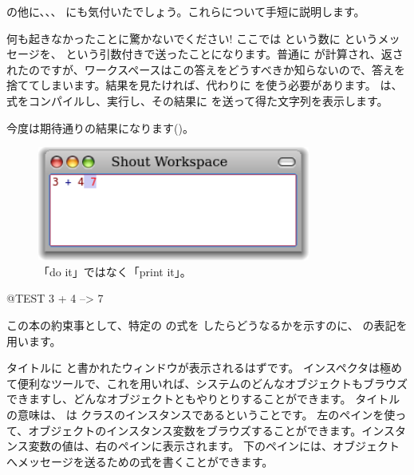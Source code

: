 \documentclass[a4paper,10pt,twoside]{book}
\begin{document}
 の他に、、、 にも気付いたでしょう。これらについて手短に説明します。


何も起きなかったことに驚かないでください! ここでは  という数に \ct{+} というメッセージを、 という引数付きで送ったことになります。普通に  が計算され、返されたのですが、ワークスペースはこの答えをどうすべきか知らないので、答えを捨ててしまいます。結果を見たければ、代わりに  を使う必要があります。 は、式をコンパイルし、実行し、その結果に  を送って得た文字列を表示します。

今度は期待通りの結果になります()。

\begin{figure}[htb]
\centerline {\includegraphics[width=0.8\textwidth]{PrintIt}}
\caption{「do it」ではなく「print it」。}
\end{figure}

\begin{code}{@TEST}
3 + 4 --> 7
\end{code}
\noindent
この本の約束事として、特定の \pharo の式を  したらどうなるかを示すのに、\ct{-->} の表記を用います。

\noindent
タイトルに  と書かれたウィンドウが表示されるはずです。
インスペクタは極めて便利なツールで、これを用いれば、システムのどんなオブジェクトもブラウズできますし、どんなオブジェクトともやりとりすることができます。
タイトルの意味は、 は  クラスのインスタンスであるということです。
左のペインを使って、オブジェクトのインスタンス変数をブラウズすることができます。インスタンス変数の値は、右のペインに表示されます。
下のペインには、オブジェクトへメッセージを送るための式を書くことができます。
\end{document}
